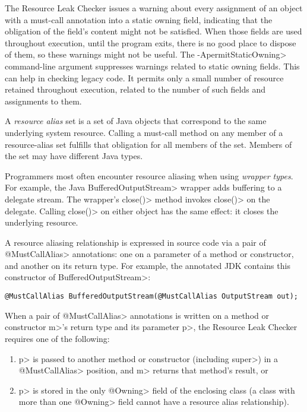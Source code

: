 \noindent
The Resource Leak Checker issues a warning about every assignment of an
object with a must-call annotation into a static owning field,
indicating that the obligation of the field's content might not be
satisfied.  When those fields are used throughout execution, until the
program exits, there is no good place to dispose of them, so these warnings
might not be useful.  The \<-ApermitStaticOwning> command-line argument
suppresses warnings related to static owning fields.  This can help in
checking legacy code.  It permits only a small number of resource retained
throughout execution, related to the number of such fields and assignments
to them.



A \emph{resource alias} set is a set of Java objects that
correspond to the same underlying system resource.
Calling a must-call method on any member of a resource-alias set
fulfills that obligation for all members of the set.
Members of the set may have different Java types.

Programmers most often encounter resource aliasing when using \emph{wrapper types}.
For example, the Java \<Buffered\-Output\-Stream> wrapper adds buffering to a
delegate stream.
The wrapper's \<close()> method invokes \<close()> on the delegate.  Calling
\<close()> on either object has the same effect:  it closes the underlying resource.

A resource aliasing relationship is expressed in source code via a pair of \<@MustCallAlias> annotations:
one on a parameter of a method or constructor, and another on its return type.
For example, the annotated JDK contains this constructor of \<BufferedOutputStream>:
\begin{Verbatim}
@MustCallAlias BufferedOutputStream(@MustCallAlias OutputStream out);
\end{Verbatim}

When a pair of \<@MustCallAlias> annotations is written on a method or constructor \<m>'s return type
and its parameter \<p>, the Resource Leak Checker requires one of the following:
\begin{enumerate}
\item \<p> is passed to another method or constructor (including \<super>) in a
  \<@MustCallAlias> position, and \<m> returns that method's result, or
\item \<p> is stored in the only \<@Owning> field of the enclosing class (a class with more than one
  \<@Owning> field cannot have a resource alias relationship).
\end{enumerate}


